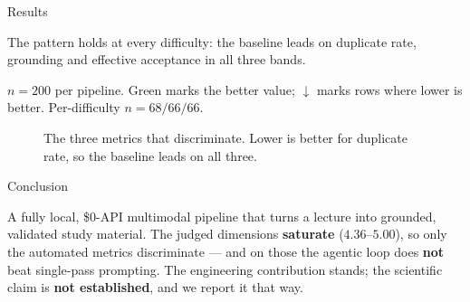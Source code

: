 \documentclass[final]{beamer}
\newcommand{\tbl}{\fontsize{24}{30}\selectfont}
\begin{document}
\begin{frame}[t]
\begin{columns}[t]
\begin{column}{\colC}
\begin{block}{Results}
\begin{minipage}[t]{0.54\colC}
      \vspace{5mm}
      {\tbl\textcolor{LAslate}{The pattern holds at every difficulty:
      the baseline leads on duplicate rate, grounding and effective
      acceptance in all three bands.}}
    \end{minipage}

    \vspace{4mm}
    {\tbl\textcolor{LAslate}{$n{=}200$ per pipeline. Green marks the better
    value; $\downarrow$ marks rows where lower is better. Per-difficulty
    $n{=}68/66/66$.}}

    \begin{figure}
      \centering
      \caption{The three metrics that discriminate. Lower is better for
      duplicate rate, so the baseline leads on all three.}
    \end{figure}

  \end{block}

  \begin{block}{Conclusion}

    A fully local, \$0-API multimodal pipeline that turns a lecture into
    grounded, validated study material. The judged dimensions \textbf{saturate}
    ($4.36$--$5.00$), so only the automated metrics discriminate --- and on
    those the agentic loop does \textbf{not} beat single-pass prompting. The
    engineering contribution stands; the scientific claim is
    \textbf{not established}, and we report it that way.


\end{block}
\end{column}
\end{columns}
\end{frame}
\end{document}
